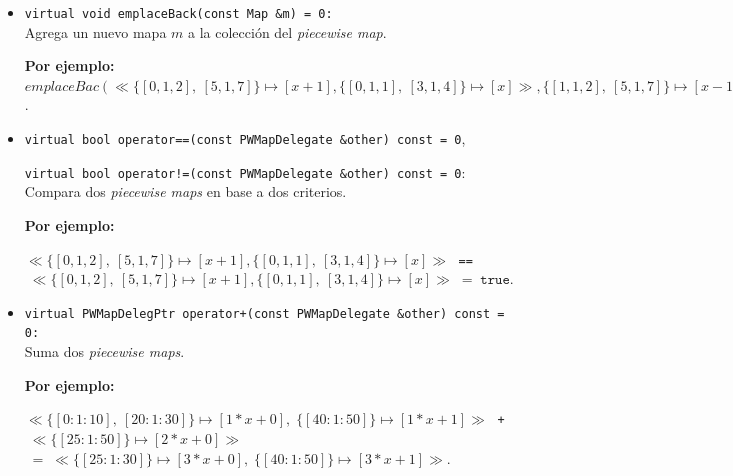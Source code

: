 \begin{itemize}

    
    \item \texttt{virtual void emplaceBack(const Map \&m) = 0:} \\
    Agrega un nuevo mapa $m$ a la colección del \textit{piecewise map}.

    \begin{center}
        \textbf{Por ejemplo:} $emplaceBac(\ll\{[0,1,2],\ [5,1,7]\} \mapsto [x+1],\{[0,1,1],\ [3,1,4]\} \mapsto [x]\gg,\{[1,1,2],\ [5,1,7]\} \mapsto [x-1])=\ll\{[0,1,2],\ [5,1,7]\} \mapsto [x+1], \{[0,1,1],\ [3,1,4]\} \mapsto [x],\{[1,1,2],\ [5,1,7]\} \mapsto [x-1]\gg$.
    \end{center}
  
    \item \texttt{virtual bool operator==(const PWMapDelegate \&other) const = 0},\par \texttt{virtual bool operator!=(const PWMapDelegate \&other) const = 0}:
    Compara dos \textit{piecewise maps} en base a dos criterios.

    \begin{center}
        \textbf{Por ejemplo:} 
        
            $\ll\{[0,1,2],\ [5,1,7]\} \mapsto [x+1],\{[0,1,1],\ [3,1,4]\} \mapsto [x]\gg \;$
            \texttt{==}
            $\;\ll\{[0,1,2],\ [5,1,7]\} \mapsto [x+1], \{[0,1,1],\ [3,1,4]\} \mapsto [x]\gg \; =\; \texttt{true}.$
         
        
    \end{center}

    \item \texttt{virtual PWMapDelegPtr operator+(const PWMapDelegate \&other) const = 0:} \\
    Suma dos \textit{piecewise maps}.


    \begin{center}
        \textbf{Por ejemplo:} 
        
            $\ll\{[0:1:10],\ [20:1:30]\} \mapsto [1*x+0],\;\{[40:1:50]\} \mapsto [1*x+1]\gg\;$
            \texttt{+}
            $\;\ll\{[25:1:50]\} \mapsto [2*x+0]\gg$
            $ \;=\; \ll\{[25:1:30]\} \mapsto [3*x+0],\; \{[40:1:50]\} \mapsto [3*x+1]\gg.$
    \end{center}
    


\end{itemize}
